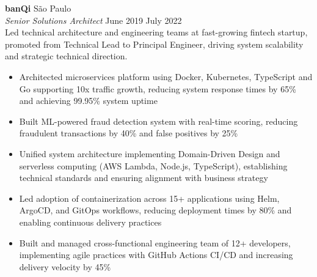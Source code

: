 \documentclass[a4paper]{article}
\begin{document}
\textbf{banQi}                                 \hfill São Paulo             \\
\textit{Senior Solutions Architect}            \hfill June 2019 \raisebox{0.2ex}{\scalebox{0.8}{$\sim$}} July 2022   \\
\vspace{0.5mm}
Led technical architecture and engineering teams at fast-growing fintech startup, promoted from Technical Lead to Principal Engineer, driving system scalability and strategic technical direction.
\vspace{-2mm}
\begin{itemize}
\setlength\itemsep{-1mm}
\item Architected microservices platform using Docker, Kubernetes, TypeScript and Go supporting 10x traffic growth, reducing system response times by 65\% and achieving 99.95\% system uptime
\item Built ML-powered fraud detection system with real-time scoring, reducing fraudulent transactions by 40\% and false positives by 25\%
\item Unified system architecture implementing Domain-Driven Design and serverless computing (AWS Lambda, Node.js, TypeScript), establishing technical standards and ensuring alignment with business strategy
\item Led adoption of containerization across 15+ applications using Helm, ArgoCD, and GitOps workflows, reducing deployment times by 80\% and enabling continuous delivery practices
\item Built and managed cross-functional engineering team of 12+ developers, implementing agile practices with GitHub Actions CI/CD and increasing delivery velocity by 45\%
\end{itemize}
\end{document}
